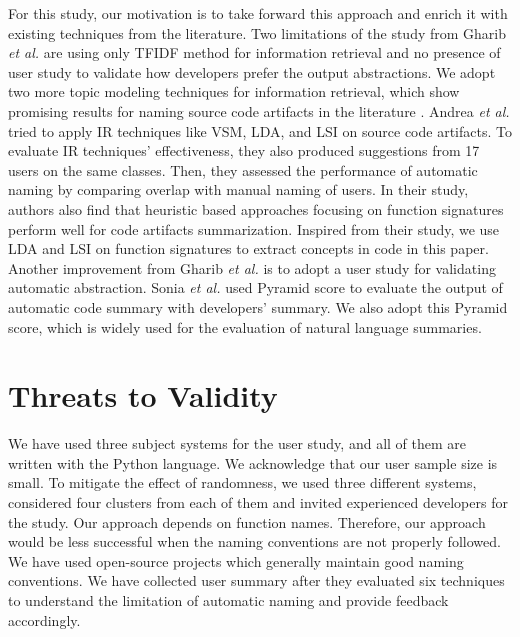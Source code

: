For this study, our motivation is to take forward this approach and enrich it with existing techniques from the literature. Two limitations of the study from Gharib \textit{et al.}  are using only TFIDF method for information retrieval and no presence of user study to validate how developers prefer the output abstractions. We adopt two more topic modeling techniques for information retrieval, which show promising results for naming source code artifacts in the literature \cite{de2012IRMethodsArtifacts}. Andrea \textit{et al.}  \cite{de2012IRMethodsArtifacts} tried to apply IR techniques like VSM, LDA, and LSI on  source code artifacts. To evaluate IR techniques' effectiveness, they also produced suggestions from 17 users on the same classes. Then, they assessed the performance of automatic naming by comparing overlap
with manual naming of users. In their study, authors also find that heuristic based approaches focusing on function signatures perform well for code artifacts summarization. Inspired from their study, we use LDA and LSI on function signatures to extract concepts in code in this paper. Another improvement from Gharib \textit{et al.} is to adopt a user study for validating automatic abstraction. Sonia \textit{et al.}  \cite{haiduc2010supporting} used Pyramid score to evaluate the output of automatic code summary with developers' summary. We also adopt this Pyramid score, which is widely used for the evaluation of natural language summaries. 

\section{Threats to Validity}
We have used three subject systems for the user study, and all of them are written with the Python language. We acknowledge that our user sample size is small. To mitigate the effect of randomness, we used three different systems, considered four clusters from each of them and invited experienced developers for the study. Our approach depends on function names. Therefore, our approach would be less successful when the naming conventions are not properly followed. We have used open-source projects which generally maintain good naming conventions.  We have collected user summary after they evaluated six techniques to understand the limitation of automatic naming and provide feedback accordingly.  

